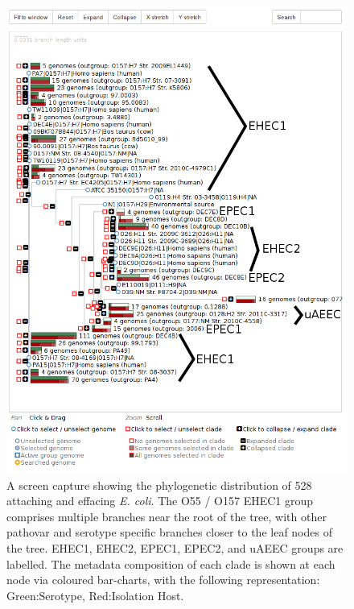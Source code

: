 \documentclass[doublespacing, linenumbers]{bmcart}
\begin{document}
\begin{backmatter}
\newpage
\begin{figure}[h!]
  \includegraphics[width=1\columnwidth]{images/aaec.png}
    \caption{A screen capture showing the phylogenetic distribution of 528 attaching and effacing \textit{E. coli}. The O55 / O157 EHEC1 group comprises multiple branches near the root of the tree, with other pathovar and serotype specific branches closer to the leaf nodes of the tree. EHEC1, EHEC2, EPEC1, EPEC2, and uAEEC groups are labelled. The metadata composition of each clade is shown at each node via coloured bar-charts, with the following representation: Green:Serotype, Red:Isolation Host.}
  \label{fig:aaec}
\end{figure}


\end{backmatter}
\end{document}
